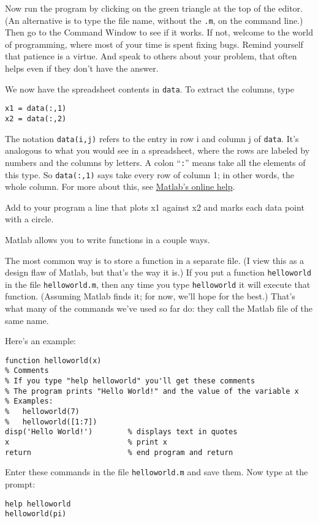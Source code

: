 \documentclass[11pt]{exam}
\begin{document}
\begin{questions}
\begin{parts}
Now run the program by clicking on the green triangle at the top of
the editor.
(An alternative is to type the file name, without the {\tt .m},
on the command line.)
Then go to the Command Window to see if it works.
If not, welcome to the world of programming, where most of your time is
spent fixing bugs.
Remind yourself that patience is a virtue.
And speak to others about your problem,
that often helps even if they don't have the answer.

\item We now have the spreadsheet contents in {\tt data}.
To extract the columns, type
\begin{verbatim}
x1 = data(:,1)
x2 = data(:,2)
\end{verbatim}
The notation {\tt data(i,j)} refers to the entry in row i and column j of
{\tt data}.
It's analogous to what you would see in a spreadsheet,
where the rows are labeled by numbers
and the columns by letters.
A colon ``{\tt :}'' means take all the elements of this type.
So {\tt data(:,1)} says take every row of column 1; in other words, the whole column.
For more about this, see
\href{http://www.mathworks.com/company/newsletters/articles/matrix-indexing-in-matlab.html}
{Matlab's online help}.

\item  Add to your program a line that plots x1 against x2
and marks each data point with a circle.
\end{parts}

Matlab allows you to write functions in a couple ways.
\begin{parts}
\item The most common way is to store a function in a separate file.
(I view this as a design flaw of Matlab, but that's the way it is.)
If you put a function {\tt helloworld} in the file {\tt helloworld.m},
then any time you type  {\tt helloworld} it will execute that function.
(Assuming Matlab finds it; for now, we'll hope for the best.)
That's what many of the commands we've used so far do:
they call the Matlab file of the same name.

Here's an example:
\begin{verbatim}
function helloworld(x)
% Comments
% If you type "help helloworld" you'll get these comments
% The program prints "Hello World!" and the value of the variable x
% Examples:
%   helloworld(7)
%   helloworld([1:7])
disp('Hello World!')        % displays text in quotes
x                           % print x
return                      % end program and return
\end{verbatim}
Enter these commands in the file {\tt helloworld.m} and save them.
Now type at the prompt:
\begin{verbatim}
help helloworld
helloworld(pi)
\end{verbatim}


\end{parts}
\end{questions}
\end{document}
